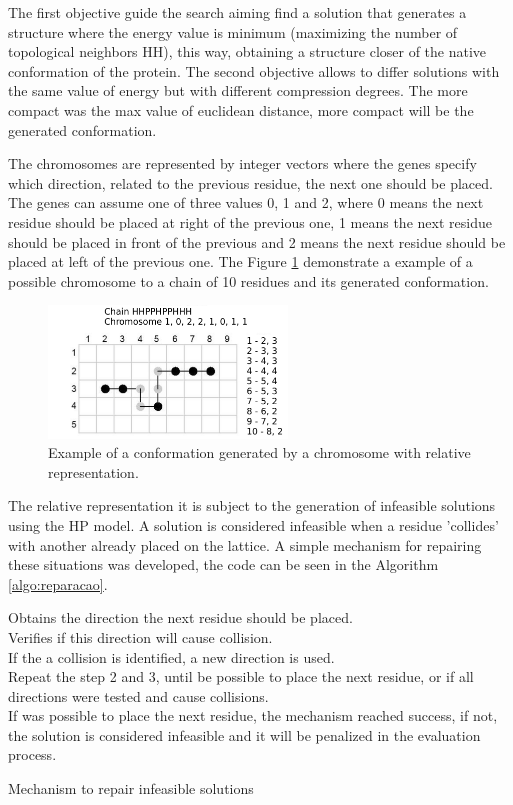 The first objective guide the search aiming find a solution that generates a structure where the energy value is minimum (maximizing the number of topological neighbors HH), this way, obtaining a structure closer of the native conformation of the protein. The second objective allows to differ solutions with the same value of energy but with different compression degrees. The more compact was the max value of euclidean distance, more compact will be the generated conformation.


The chromosomes are represented by integer vectors where the genes specify which direction, related to the previous residue, the next one should be placed. The genes can assume one of three values 0, 1 and 2, where 0 means the next residue should be placed at right of the previous one, 1 means the next residue should be placed in front of the previous and 2 means the next residue should be placed at left of the previous one. The Figure \ref{fig_sim} demonstrate a example of a possible chromosome to a chain of 10 residues and its generated conformation.


\begin{figure}[ht]
	\centering
	\includegraphics[width=2.5in]{figures/figure3.png}
	\caption{Example of a conformation generated by a chromosome with relative representation.}
	\label{fig_sim}
\end{figure}


The relative representation it is subject to the generation of infeasible solutions using the HP model. A solution is considered infeasible when a residue 'collides' with another already placed on the lattice. A simple mechanism for repairing these situations was developed, the code can be seen in the Algorithm \ref{algo:reparacao}.


\begin{algorithm}[h]
	Obtains the direction the next residue should be placed.\\
	Verifies if this direction will cause collision.\\
	If the a collision is identified, a new direction is used.\\
	Repeat the step 2 and 3, until be possible to place the next residue, or if all directions were tested and cause collisions.\\
	If was possible to place the next residue, the mechanism reached success, if not, the solution is considered infeasible and it will be penalized in the evaluation process.
	\caption{Mechanism to repair infeasible solutions}
	\label{algo:reparacao}
\end{algorithm}



